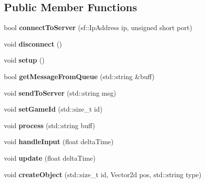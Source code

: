 \subsection*{Public Member Functions}
\begin{DoxyCompactItemize}
\item 
bool {\bfseries connect\+To\+Server} (sf\+::\+Ip\+Address ip, unsigned short port)\hypertarget{class_client_a53bc36612e5352fac441a0a38bdb0d9c}{}\label{class_client_a53bc36612e5352fac441a0a38bdb0d9c}

\item 
void {\bfseries disconnect} ()\hypertarget{class_client_a97e144b48409c0a9873eee09f04ce724}{}\label{class_client_a97e144b48409c0a9873eee09f04ce724}

\item 
void {\bfseries setup} ()\hypertarget{class_client_a33b0b1f7391689c68fa125549e8c5dcc}{}\label{class_client_a33b0b1f7391689c68fa125549e8c5dcc}

\item 
bool {\bfseries get\+Message\+From\+Queue} (std\+::string \&buff)\hypertarget{class_client_af2a603210e401e7374b69457a20aec81}{}\label{class_client_af2a603210e401e7374b69457a20aec81}

\item 
void {\bfseries send\+To\+Server} (std\+::string msg)\hypertarget{class_client_a802ec0c30a7e39feca055bb98ea28a2d}{}\label{class_client_a802ec0c30a7e39feca055bb98ea28a2d}

\item 
void {\bfseries set\+Game\+Id} (std\+::size\+\_\+t id)\hypertarget{class_client_a23899458ea9b3b6c489185133962fa54}{}\label{class_client_a23899458ea9b3b6c489185133962fa54}

\item 
void {\bfseries process} (std\+::string buff)\hypertarget{class_client_a8757d230a5129c2ed9ffa8cf5c25c727}{}\label{class_client_a8757d230a5129c2ed9ffa8cf5c25c727}

\item 
void {\bfseries handle\+Input} (float delta\+Time)\hypertarget{class_client_acde8cc0ebede83516ac4b14620d9eb6a}{}\label{class_client_acde8cc0ebede83516ac4b14620d9eb6a}

\item 
void {\bfseries update} (float delta\+Time)\hypertarget{class_client_aa50bf068e93aa26d9905d2a7eaef25a0}{}\label{class_client_aa50bf068e93aa26d9905d2a7eaef25a0}

\item 
void {\bfseries create\+Object} (std\+::size\+\_\+t id, Vector2d pos, std\+::string type)\hypertarget{class_client_aa284ea5e10f9b8448ea49f4d3ee4e7db}{}\label{class_client_aa284ea5e10f9b8448ea49f4d3ee4e7db}


\end{DoxyCompactItemize}
